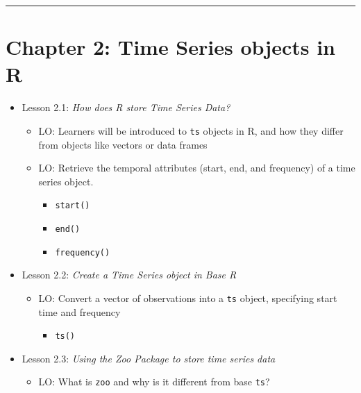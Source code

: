 \documentclass[
]{book}
\providecommand{\tightlist}{%
  \setlength{\itemsep}{0pt}\setlength{\parskip}{0pt}}
\begin{document}
\begin{center}\rule{0.5\linewidth}{0.5pt}\end{center}

\hypertarget{chapter-2-time-series-objects-in-r}{%
\section{Chapter 2: Time Series objects in R}\label{chapter-2-time-series-objects-in-r}}

\begin{itemize}
\tightlist
\item
  Lesson 2.1: \emph{How does R store Time Series Data?}

  \begin{itemize}
  \tightlist
  \item
    LO: Learners will be introduced to \texttt{ts} objects in R, and how they differ from objects like vectors or data frames
  \item
    LO: Retrieve the temporal attributes (start, end, and frequency) of a time series object.

    \begin{itemize}
    \tightlist
    \item
      \texttt{start()}
    \item
      \texttt{end()}
    \item
      \texttt{frequency()}
    \end{itemize}
  \end{itemize}
\item
  Lesson 2.2: \emph{Create a Time Series object in Base R}

  \begin{itemize}
  \tightlist
  \item
    LO: Convert a vector of observations into a \texttt{ts} object, specifying start time and frequency

    \begin{itemize}
    \tightlist
    \item
      \texttt{ts()}
    \end{itemize}
  \end{itemize}
\item
  Lesson 2.3: \emph{Using the Zoo Package to store time series data}

  \begin{itemize}
  \tightlist
  \item
    LO: What is \texttt{zoo} and why is it different from base \texttt{ts}?


\end{itemize}
\end{itemize}
\end{document}
